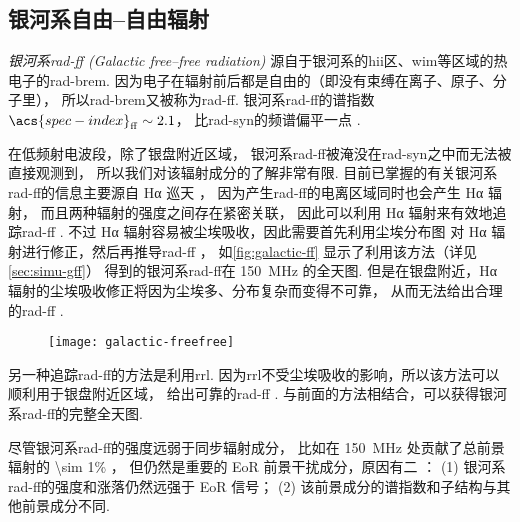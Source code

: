 \subsection{银河系自由--自由辐射}

\emph{银河系\acs{rad-ff} (Galactic free--free radiation)}
源自于银河系的\ac{hii}区、\ac{wim}等区域的热电子的\ac{rad-brem}.
因为电子在辐射前后都是自由的（即没有束缚在离子、原子、分子里），
所以\ac{rad-brem}又被称为\ac{rad-ff}.
银河系\ac{rad-ff}的谱指数 $\acs{spec-index}_{\R{ff}} \sim 2.1$，
比\ac{rad-syn}的频谱偏平一点 \cite{dickinson2003}.

在低频射电波段，除了银盘附近区域，
银河系\ac{rad-ff}被淹没在\ac{rad-syn}之中而无法被直接观测到，
所以我们对该辐射成分的了解非常有限.
目前已掌握的有关银河系\ac{rad-ff}的信息主要源自 Hα 巡天 \cite{finkbeiner2003}，
因为产生\ac{rad-ff}的电离区域同时也会产生 Hα 辐射，
而且两种辐射的强度之间存在紧密关联，
因此可以利用 Hα 辐射来有效地追踪\ac{rad-ff} \cite{smoot1998,dickinson2003}.
不过 Hα 辐射容易被尘埃吸收，因此需要首先利用尘埃分布图\cite{schlegel1998}
对 Hα 辐射进行修正，然后再推导\ac{rad-ff} \cite{dickinson2003}，
如\autoref{fig:galactic-ff} 显示了利用该方法（详见 \autoref{sec:simu-gff}）
得到的银河系\ac{rad-ff}在 \SI{150}{\MHz} 的全天图.
但是在银盘附近，Hα 辐射的尘埃吸收修正将因为尘埃多、分布复杂而变得不可靠，
从而无法给出合理的\ac{rad-ff} \cite{dickinson2003}.

\begin{figure}[htp]
  \centering
  \texttt{[image: galactic-freefree]}
  \label{fig:galactic-ff}
\end{figure}

另一种追踪\ac{rad-ff}的方法是利用\ac{rrl}.
因为\ac{rrl}不受尘埃吸收的影响，所以该方法可以顺利用于银盘附近区域，
给出可靠的\ac{rad-ff} \cite{alves2010,alves2012}.
与前面的方法相结合，可以获得银河系\ac{rad-ff}的完整全天图.

尽管银河系\ac{rad-ff}的强度远弱于同步辐射成分，
比如在 \SI{150}{\MHz} 处贡献了总前景辐射的 \num{\sim 1}\% \cite{shaver1999}，
但仍然是重要的 EoR 前景干扰成分，原因有二 \cite{jelic2008}：
(1) 银河系\ac{rad-ff}的强度和涨落仍然远强于 EoR 信号；
(2) 该前景成分的谱指数和子结构与其他前景成分不同.

